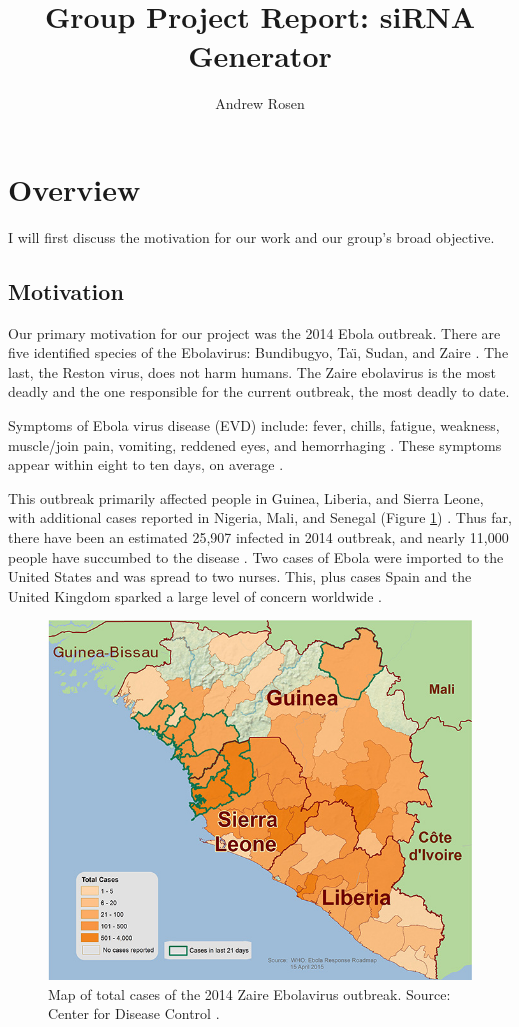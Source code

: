 \documentclass[10pt,letterpaper]{article}
\author{Andrew Rosen}
\title{Group Project Report: siRNA Generator}
\date{}
\begin{document}
\maketitle

\section{Overview}
I will first discuss the motivation for our work and our group's broad objective.


\subsection{Motivation}
Our primary motivation for our project was the 2014 Ebola outbreak.
There are five identified species of the Ebolavirus: Bundibugyo, Ta\"{\i}, Sudan, and Zaire \cite{centers20152014}.
The last, the Reston virus, does not harm humans.
The Zaire ebolavirus is the most deadly and the one responsible for the current outbreak, the most deadly to date.

Symptoms of Ebola virus disease (EVD) include: fever, chills, fatigue, weakness, muscle/join pain,  vomiting, reddened eyes, and hemorrhaging \cite{team2014ebola} \cite{wongcharacterization}.
These symptoms appear within eight to ten days, on average \cite{centers20152014}.


This outbreak primarily affected people in Guinea, Liberia, and Sierra Leone, with additional cases reported in Nigeria, Mali, and Senegal (Figure \ref{fig:west-africa-distribution-map}) \cite{centers20152014}.
Thus far, there have been an estimated 25,907 infected in 2014 outbreak, and nearly 11,000 people have succumbed to the disease \cite{centers20152014}.
Two cases of Ebola were imported to the United States and was spread to two nurses. 
This, plus cases Spain and the United Kingdom sparked a large level of concern worldwide  \cite{levin2015ebola} \cite{ready}.

\begin{figure}[h]
\centering
\includegraphics[width=0.5\linewidth]{west-africa-distribution-map}
\caption{Map of total cases of the 2014 Zaire Ebolavirus outbreak. Source: Center for Disease Control \cite{centers20152014}.}
\label{fig:west-africa-distribution-map}
\end{figure}
\end{document}
